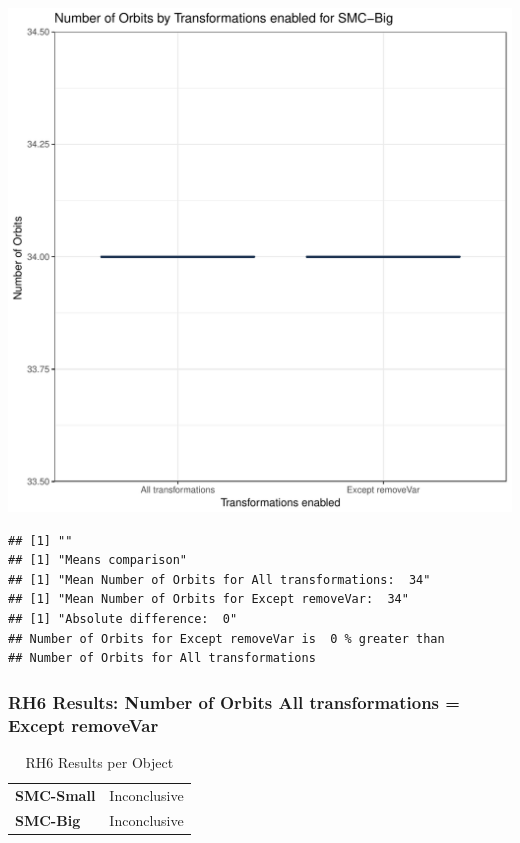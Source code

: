 \documentclass{article}\usepackage[]{graphicx}\usepackage[]{color}
\makeatletter
\def\maxwidth{ %
  \ifdim\Gin@nat@width>\linewidth
    \linewidth
  \else
    \Gin@nat@width
  \fi
}
\newenvironment{kframe}{%
 \def\at@end@of@kframe{}%
 \ifinner\ifhmode%
  \def\at@end@of@kframe{\end{minipage}}%
  \begin{minipage}{\columnwidth}%
 \fi\fi%
 \def\FrameCommand##1{\hskip\@totalleftmargin \hskip-\fboxsep
 \colorbox{shadecolor}{##1}\hskip-\fboxsep
     \hskip-\linewidth \hskip-\@totalleftmargin \hskip\columnwidth}%
 \MakeFramed {\advance\hsize-\width
   \@totalleftmargin\z@ \linewidth\hsize
   \@setminipage}}%
 {\par\unskip\endMakeFramed%
 \at@end@of@kframe}
\newenvironment{knitrout}{}{} %
\makeatother
\begin{document}
\begin{knitrout}
\color{fgcolor}
\includegraphics[width=\maxwidth]{figure/RH6_big-1} 
\begin{kframe}

{\ttfamily\noindent\bfseries\color{errorcolor}{\#\# Error in eval(expr, envir, enclos): object 'shap\_cashew\_big' not found}}\begin{verbatim}
## [1] ""
## [1] "Means comparison"
## [1] "Mean Number of Orbits for All transformations:  34"
## [1] "Mean Number of Orbits for Except removeVar:  34"
## [1] "Absolute difference:  0"
## Number of Orbits for Except removeVar is  0 % greater than 
## Number of Orbits for All transformations
\end{verbatim}
\end{kframe}
\end{knitrout}


 

	
	\subsubsection{RH6 Results: Number of Orbits All transformations = Except removeVar}
	
	
	\begin{table}[H]
	\centering
	\caption{RH6 Results per Object}
	\begin{tabular}{ll}
	\textbf{SMC-Small} & Inconclusive \\
	\textbf{SMC-Big} & Inconclusive \\
	\end{tabular}
	\end{table}
\end{document}
